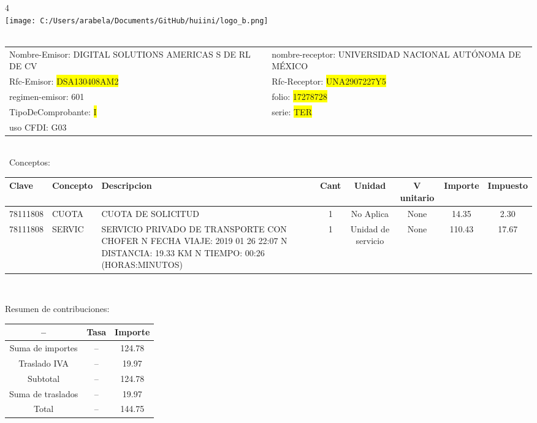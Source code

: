 \documentclass{article}
\begin{document}
\hspace{18cm} 4\\
\texttt{[image: C:/Users/arabela/Documents/GitHub/huiini/logo\_b.png]}
\bigskip\\\
\begin{tabular}{p{11cm}p{1cm}p{8cm}}

Nombre-Emisor: DIGITAL SOLUTIONS AMERICAS S DE RL DE CV && nombre-receptor: UNIVERSIDAD NACIONAL AUTÓNOMA DE MÉXICO\\

Rfc-Emisor: \colorbox{yellow}{ DSA130408AM2 } & & Rfc-Receptor: \colorbox{yellow}{ UNA2907227Y5 }\\

regimen-emisor: 601 & & folio: \colorbox{yellow}{ 17278728 }\\

TipoDeComprobante: \colorbox{yellow}{ I } & & serie: \colorbox{yellow}{ TER }\\

uso CFDI: G03\\



\end{tabular}
\bigskip\bigskip\bigskip\\\
Conceptos:\\
\begin{tabular}{|p{1.5cm}|p{3.6cm}|p{3.6cm}|c|c|c|c|c|}
\hline
Clave & Concepto & Descripcion & Cant & Unidad & V unitario & Importe & Impuesto \\
\hline

78111808 & CUOTA  & CUOTA DE SOLICITUD & 1 & No Aplica & None & 14.35 &  2.30 \\
\hline

78111808 & SERVIC & SERVICIO PRIVADO DE TRANSPORTE CON CHOFER  N FECHA VIAJE: 2019 01 26 22:07  N DISTANCIA: 19.33 KM  N TIEMPO: 00:26 (HORAS:MINUTOS) & 1 & Unidad de servicio & None & 110.43 &  17.67 \\
\hline

\end{tabular}\\
\bigskip
\begin{center}
Resumen de contribuciones:\\
\bigskip
\begin{tabular}{|c|c|c|}
\hline
 -- & Tasa & Importe\\
\hline

Suma de importes & -- & 124.78 \\
\hline

Traslado IVA & -- & 19.97 \\
\hline

Subtotal  & -- & 124.78 \\
\hline

Suma de traslados & -- & 19.97 \\
\hline

Total  & -- & 144.75 \\
\hline

\end{tabular}
\end{center}
\end{document}
